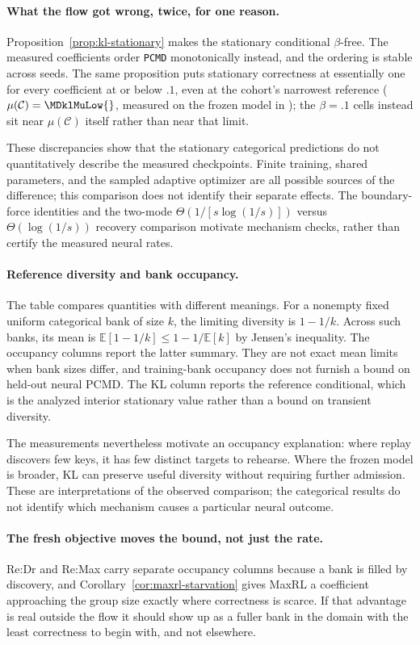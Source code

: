\documentclass{article}
\newcommand{\1}{\mathbf 1}
\newcommand{\E}{\mathbb E}
\newcommand{\pmd}{\texttt{PCMD}}
\theoremstyle{remark}
\theoremstyle{definition}
\theoremstyle{plain}
\begin{document}
\paragraph{What the flow got wrong, twice, for one reason.}
Proposition~\ref{prop:kl-stationary} makes the stationary conditional
$\beta$-free. The measured coefficients order \pmd{} monotonically instead, and
the ordering is stable across seeds. The same proposition puts stationary
correctness at essentially one for every coefficient at or below $.1$, even at
the cohort's narrowest reference ($\mu(\mathcal C)=\MDklMuLow{}$, measured on
the frozen model in \MDklMuLowDomain{}); the $\beta=.1$ cells instead sit near
$\mu(\mathcal C)$ itself rather than near that limit.

These discrepancies show that the stationary categorical predictions do
not quantitatively describe the measured checkpoints. Finite training,
shared parameters, and the sampled adaptive optimizer are all possible
sources of the difference; this comparison does not identify their separate
effects. The boundary-force identities and the two-mode
$\Theta(1/[s\log(1/s)])$ versus $\Theta(\log(1/s))$ recovery comparison
motivate mechanism checks, rather than certify the measured neural rates.

\paragraph{Reference diversity and bank occupancy.}
The table compares quantities with different meanings. For a nonempty fixed
uniform categorical bank of size $k$, the limiting diversity is $1-1/k$.
Across such banks, its mean is $\E[1-1/k]\le1-1/\E[k]$ by Jensen's
inequality. The occupancy columns report the latter summary. They are not
exact mean limits when bank sizes differ, and training-bank occupancy does
not furnish a bound on held-out neural PCMD.
The KL column reports the reference conditional, which is the analyzed
interior stationary value rather than a bound on transient diversity.

The measurements nevertheless motivate an occupancy explanation: where
replay discovers few keys, it has few distinct targets to rehearse.
Where the frozen model is broader, KL can preserve useful diversity without
requiring further admission. These are interpretations of the observed
comparison; the categorical results do not identify which mechanism
causes a particular neural outcome.

\paragraph{The fresh objective moves the bound, not just the rate.}
Re:Dr and Re:Max carry separate occupancy columns because a bank is filled by
discovery, and Corollary~\ref{cor:maxrl-starvation} gives MaxRL a coefficient
approaching the group size exactly where correctness is scarce. If that
advantage is real outside the flow it should show up as a fuller bank in the
domain with the least correctness to begin with, and not elsewhere.
\end{document}
